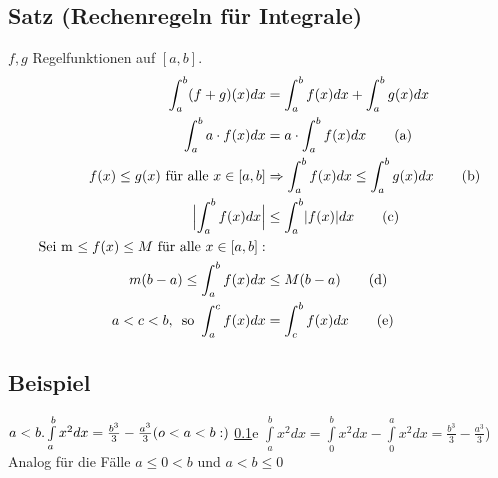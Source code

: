 \subsection{Satz (Rechenregeln für Integrale)}\label{sec:7.9}
$f,g$ Regelfunktionen auf $[a,b]$.
\begin{align}
\int_{a}^{b} (f+g)(x)dx &= \int_{a}^{b} f(x)dx + \int_{a}^{b} g(x)dx \notag\\
\int_{a}^{b} a \cdot f(x)dx &= a \cdot \int_{a}^{b} f(x)dx  \tag{a}\\
f(x) \le g(x) \text{ für alle } x \in [a,b] &\Rightarrow \int_{a}^{b} f(x)dx \le \int_{a}^{b} g(x)dx \tag{b}\\
\Bigl\lvert\int_{a}^{b} f(x)dx\Bigr\rvert &\le \int_{a}^{b} \lvert f(x) \rvert dx \tag{c}\\
\text{Sei m $\le f(x)$} \le M\text{ für alle $x \in [a,b]$}: \notag \\
m(b-a) \le \int_{a}^{b} f(x)dx &\le M(b-a) \tag{d}\\
a < c < b,\, \text{ so } \int_{a}^{c} f(x)dx &= \int_{c}^{b} f(x)dx \tag{e}
\end{align}
\subsection{Beispiel}
$a < b. \int\limits_{a}^{b} x^2 dx = \frac{b^3}{3} - \frac{a^3}{3}\\
(o < a < b :)$ \ref{sec:7.9}e $\int\limits_{a}^{b} x^2 dx = \int\limits_{0}^{b} x^2 dx - \int\limits_{0}^{a} x^2 dx = \frac{b^3}{3} - \frac{a^3}{3}$)\\
Analog für die Fälle $a \le 0 < b$ und $a < b \le 0$
